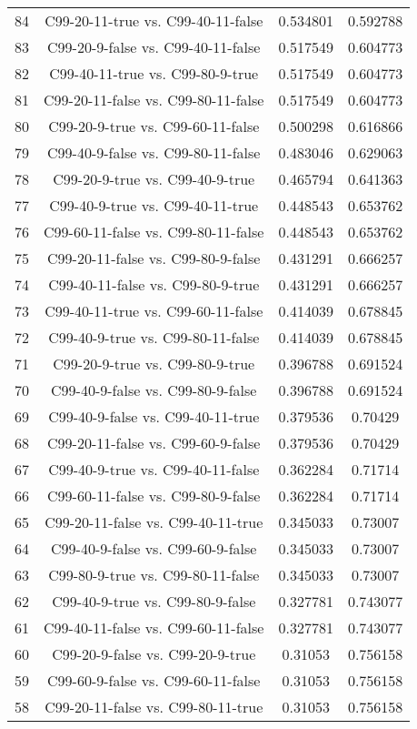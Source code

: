 \documentclass[a4paper,10pt]{article}
\begin{document}
\begin{landscape}
\begin{table}[!htp]
\begin{tabular}{cccc}
84&C99-20-11-true vs. C99-40-11-false&0.534801&0.592788\\
83&C99-20-9-false vs. C99-40-11-false&0.517549&0.604773\\
82&C99-40-11-true vs. C99-80-9-true&0.517549&0.604773\\
81&C99-20-11-false vs. C99-80-11-false&0.517549&0.604773\\
80&C99-20-9-true vs. C99-60-11-false&0.500298&0.616866\\
79&C99-40-9-false vs. C99-80-11-false&0.483046&0.629063\\
78&C99-20-9-true vs. C99-40-9-true&0.465794&0.641363\\
77&C99-40-9-true vs. C99-40-11-true&0.448543&0.653762\\
76&C99-60-11-false vs. C99-80-11-false&0.448543&0.653762\\
75&C99-20-11-false vs. C99-80-9-false&0.431291&0.666257\\
74&C99-40-11-false vs. C99-80-9-true&0.431291&0.666257\\
73&C99-40-11-true vs. C99-60-11-false&0.414039&0.678845\\
72&C99-40-9-true vs. C99-80-11-false&0.414039&0.678845\\
71&C99-20-9-true vs. C99-80-9-true&0.396788&0.691524\\
70&C99-40-9-false vs. C99-80-9-false&0.396788&0.691524\\
69&C99-40-9-false vs. C99-40-11-true&0.379536&0.70429\\
68&C99-20-11-false vs. C99-60-9-false&0.379536&0.70429\\
67&C99-40-9-true vs. C99-40-11-false&0.362284&0.71714\\
66&C99-60-11-false vs. C99-80-9-false&0.362284&0.71714\\
65&C99-20-11-false vs. C99-40-11-true&0.345033&0.73007\\
64&C99-40-9-false vs. C99-60-9-false&0.345033&0.73007\\
63&C99-80-9-true vs. C99-80-11-false&0.345033&0.73007\\
62&C99-40-9-true vs. C99-80-9-false&0.327781&0.743077\\
61&C99-40-11-false vs. C99-60-11-false&0.327781&0.743077\\
60&C99-20-9-false vs. C99-20-9-true&0.31053&0.756158\\
59&C99-60-9-false vs. C99-60-11-false&0.31053&0.756158\\
58&C99-20-11-false vs. C99-80-11-true&0.31053&0.756158\\

\end{tabular}
\end{table}
\end{landscape}
\end{document}
